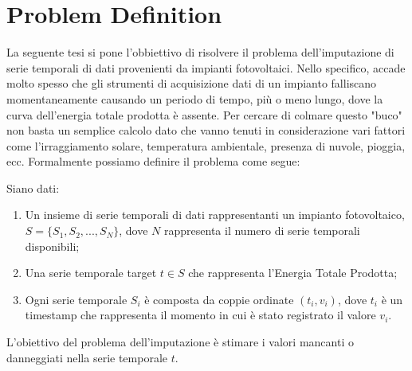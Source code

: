 \section{Problem Definition}
La seguente tesi si pone l'obbiettivo di risolvere il problema dell'imputazione
di serie temporali di dati provenienti da impianti fotovoltaici. Nello
specifico, accade molto spesso che gli strumenti di acquisizione dati di un
impianto falliscano momentaneamente causando un periodo di tempo, più o meno
lungo, dove la curva dell'energia totale prodotta è assente. Per cercare di
colmare questo "buco" non basta un semplice calcolo dato che vanno tenuti in
considerazione vari fattori come l'irraggiamento solare, temperatura ambientale,
presenza di nuvole, pioggia, ecc.
Formalmente possiamo definire il problema come segue:

\begin{definition}
    Siano dati:
    \begin{enumerate}
        \item  Un insieme di serie temporali di dati rappresentanti un impianto
              fotovoltaico, $S = \{S_1, S_2, ..., S_N\}$, dove $N$ rappresenta
              il numero di serie temporali disponibili;
        \item Una serie temporale target $t \in S$ che rappresenta l'Energia
              Totale Prodotta;
        \item Ogni serie temporale $S_i$ è composta da coppie ordinate $(t_i, v_i)$,
              dove $t_i$ è un timestamp che rappresenta il momento in cui è stato
              registrato il valore $v_i$.
    \end{enumerate}

    L'obiettivo del problema dell'imputazione è stimare i valori mancanti o
    danneggiati nella serie temporale $t$.
\end{definition}







